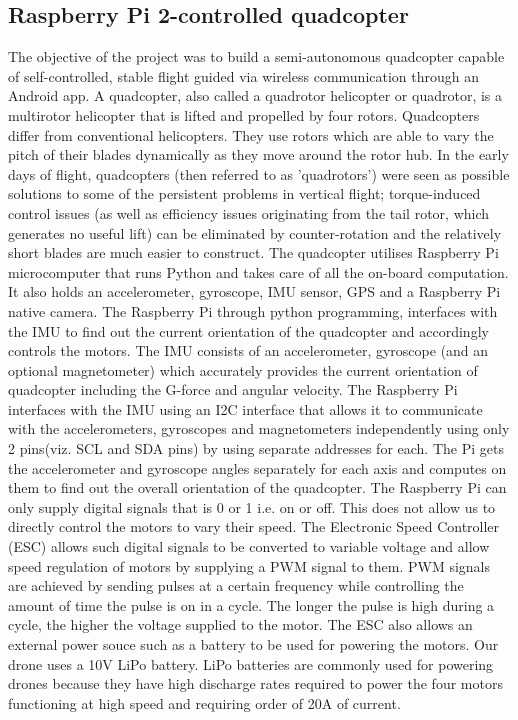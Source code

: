 \subsection{Raspberry Pi 2-controlled quadcopter}
The objective of the project was to build a semi-autonomous quadcopter capable of self-controlled, stable flight guided via wireless communication through an Android app. 
A quadcopter, also called a quadrotor helicopter or quadrotor, is a multirotor helicopter that is lifted and propelled by four rotors. Quadcopters differ from conventional helicopters. They use rotors which are able to vary the pitch of their blades dynamically as they move around the rotor hub. In the early days of flight, quadcopters (then referred to as 'quadrotors') were seen as possible solutions to some of the persistent problems in vertical flight; torque-induced control issues (as well as efficiency issues originating from the tail rotor, which generates no useful lift) can be eliminated by counter-rotation and the relatively short blades are much easier to construct.
The quadcopter utilises Raspberry Pi microcomputer that runs Python and takes care of all the on-board computation. It also holds an accelerometer, gyroscope, IMU sensor, GPS and a Raspberry Pi native camera.
The Raspberry Pi through python programming, interfaces with the IMU to find out the current orientation of the quadcopter and accordingly controls the motors. The IMU consists of an accelerometer, gyroscope (and an optional magnetometer) which accurately provides the current orientation of quadcopter including the G-force and angular velocity. The Raspberry Pi interfaces with the IMU using an I2C interface that allows it to communicate with the accelerometers, gyroscopes and magnetometers independently using only 2 pins(viz. SCL and SDA pins) by using separate addresses for each. The Pi gets the accelerometer and gyroscope angles separately for each axis and computes on them to find out the overall orientation of the quadcopter.
The Raspberry Pi can only supply digital signals that is 0 or 1 i.e. on or off. This does not allow us to directly control the motors to vary their speed. The Electronic Speed Controller (ESC) allows such digital signals to be converted to variable voltage and allow speed regulation of motors by supplying a PWM signal to them. PWM signals are achieved by sending pulses at a certain frequency while controlling the amount of time the pulse is on in a cycle. The longer the pulse is high during a cycle, the higher the voltage supplied to the motor. The ESC also allows an external power souce such as a battery to be used for powering the motors. Our drone uses a 10V LiPo battery. LiPo batteries are commonly used for powering drones because they have high discharge rates required to power the four motors functioning at high speed and requiring order of 20A of current. 
